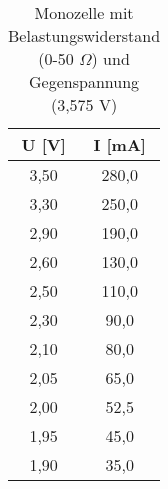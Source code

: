 \begin{table}[h]
	\begin{center}
		\begin{tabular}{cc}
			U [V]&I [mA] \\ \hline
			3,50&280,0\\
			3,30&250,0\\
			2,90&190,0\\
			2,60&130,0\\
			2,50&110,0\\
			2,30&90,0\\
			2,10&80,0\\
			2,05&65,0\\
			2,00&52,5\\
			1,95&45,0\\
			1,90&35,0
		\end{tabular}
		\caption{Monozelle mit Belastungswiderstand (0-50 $\Omega$) und Gegenspannung (3,575 V)}
		\label{tabc}
	\end{center}
\end{table}